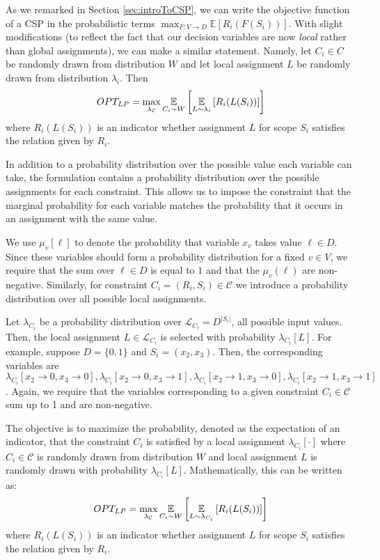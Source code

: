 As we remarked in Section \ref{sec:introToCSP}, we can write the objective function of a CSP in the probabilistic terms $\max_{F : V \to D} \mathbb{E}\left[ R_i(F(S_i)) \right]$. With slight modifications (to reflect the fact that our decision variables are now \textit{local} rather than global assignments), we can make a similar statement. Namely, let $C_i \in C$ be randomly drawn from distribution $W$ and let local assignment $L$ be randomly drawn from distribution $\lambda_i$. Then 
\[
	OPT_{LP} = \max_{\lambda_{\mathcal{C}}} \underset{C_i \sim W}{\mathbb{E}} \left[ \underset{L \sim \lambda_{i}}{\mathbb{E}} \left[ R_i( L (S_i )) \right] \right]
\]
where $R_i( L (S_i ))$ is an indicator whether assignment $L$ for scope $S_i$ satisfies the relation given by $R_i$.

\iffalse
In addition to a probability distribution over the possible value each variable can take, the formulation contains a probability distribution over the possible assignments for each constraint.
This allows us to impose the constraint that the marginal probability for each variable matches the probability that it occurs in an assignment with the same value.

We use $\mu_v[\ell]$ to denote the probability that variable $x_v$ takes value $\ell \in D$.
Since these variables should form a probability distribution for a fixed $v \in V$, we require that the sum over $\ell \in D$ is equal to $1$ and that the $\mu_v(\ell)$ are non-negative.
Similarly, for constraint $C_i = (R_i, S_i) \in \mathcal{C}$ we introduce a probability distribution over all possible local assignments.

Let $\lambda_{C_i}$ be a probability distribution over  $\mathcal{L}_{C_i} = D^{|S_i|}$, all possible input values.
Then, the local assignment $L \in \mathcal{L}_{C_i}$ is selected with probability $\lambda_{C_i}[L]$.
For example, suppose $D = \{0,1\}$ and $S_i = (x_2,x_3)$. 
Then, the corresponding variables are $\lambda_{C_i}[x_2 \rightarrow 0, x_3 \rightarrow 0], \lambda_{C_i}[x_2 \rightarrow 0, x_3 \rightarrow 1], \lambda_{C_i}[x_2 \rightarrow 1, x_3 \rightarrow 0], \lambda_{C_i}[x_2 \rightarrow 1, x_3 \rightarrow 1]$. Again, we require that the variables corresponding to a given constraint $C_i \in \mathcal{C}$ sum up to 1 and are non-negative.

The objective is to maximize the probability, denoted as the expectation of an indicator, that the constraint $C_i$ is satisfied by a local assignment $\lambda_{C_i}[\cdot]$ where $C_i \in \mathcal{C}$ is randomly drawn from distribution $W$ and local assignment $L$ is randomly drawn with probability $\lambda_{C_i}[L]$. 
Mathematically, this can be written as:
\[
	OPT_{LP} = \max_{\lambda_{\mathcal{C}}} \underset{C_i \sim W}{\mathbb{E}} \left[ \underset{L \sim \lambda_{C_i}}{\mathbb{E}} \left[ R_i( L (S_i )) \right] \right]
\]
where $R_i( L (S_i ))$ is an indicator whether assignment $L$ for scope $S_i$ satisfies the relation given by $R_i$.

